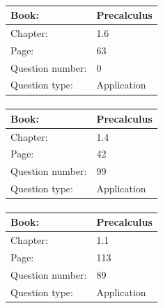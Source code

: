 \documentclass{article}
\begin{document}
            \paragraph{}
            \begin{tabularx}{1\textwidth}{
                    p{}
                    p{}
                }
                \toprule
                Book: & Precalculus
                \\
                \midrule
                Chapter: & 1.6
                \\
                \midrule
                Page: & 63
                \\
                \midrule
                Question number: & 0
                \\
                \midrule
                Question type: & Application
                \\
                \bottomrule
            \end{tabularx}
            
            \paragraph{}
            \begin{tabularx}{1\textwidth}{
                    p{}
                    p{}
                }
                \toprule
                Book: & Precalculus
                \\
                \midrule
                Chapter: & 1.4
                \\
                \midrule
                Page: & 42
                \\
                \midrule
                Question number: & 99
                \\
                \midrule
                Question type: & Application
                \\
                \bottomrule
            \end{tabularx}
            
            \paragraph{}
            \begin{tabularx}{1\textwidth}{
                    p{}
                    p{}
                }
                \toprule
                Book: & Precalculus
                \\
                \midrule
                Chapter: & 1.1
                \\
                \midrule
                Page: & 113
                \\
                \midrule
                Question number: & 89
                \\
                \midrule
                Question type: & Application
                \\
                \bottomrule
            \end{tabularx}
            
\end{document}
